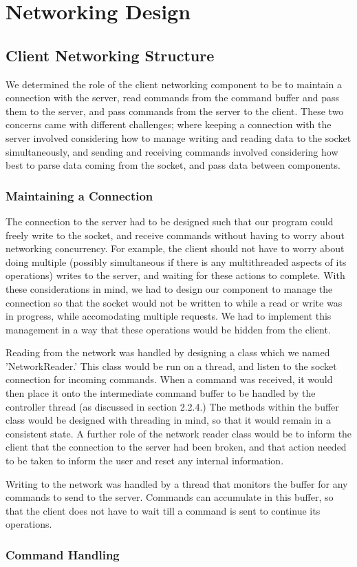 \section{Networking Design}

\subsection{Client Networking Structure}

We determined the role of the client networking component to be to maintain a connection with the server, read commands from the command buffer and pass them to the server, and pass commands from the server to the client. These two concerns came with different challenges; where keeping a connection with the server involved considering how to manage writing and reading data to the socket simultaneously, and sending and receiving commands involved considering how best to parse data coming from the socket, and pass data between components.

\subsubsection {Maintaining a Connection}

The connection to the server had to be designed such that our program could freely write to the socket, and receive commands without having to worry about networking concurrency. For example, the client should not have to worry about doing multiple (possibly simultaneous if there is any multithreaded aspects of its operations) writes to the server, and waiting for these actions to complete. With these considerations in mind, we had to design our component to manage the connection so that the socket would not be written to while a read or write was in progress, while accomodating multiple requests. We had to implement this management in a way that these operations would be hidden from the client. 

Reading from the network was handled by designing a class which we named 'NetworkReader.' This class would be run on a thread, and listen to the socket connection for incoming commands. When a command was received, it would then place it onto the intermediate command buffer to be handled by the controller thread (as discussed in section 2.2.4.) The methods within the buffer class would be designed with threading in mind, so that it would remain in a consistent state. A further role of the network reader class would be to inform the client that the connection to the server had been broken, and that action needed to be taken to inform the user and reset any internal information.

Writing to the network was handled by a thread that monitors the buffer for any commands to send to the server. Commands can accumulate in this buffer, so that the client does not have to wait till a command is sent to continue its operations. 





\subsubsection {Command Handling }










